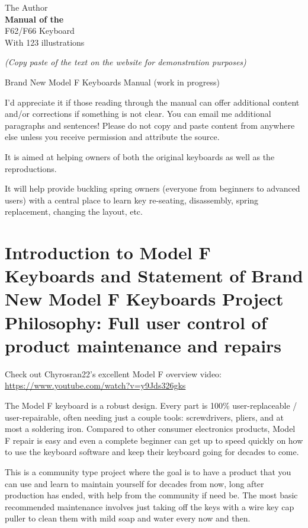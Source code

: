 \documentclass[a5paper, twoside]{memoir}
\newcommand*{\plogo}{\fbox{$\mathcal{PL}$}}
\newcommand*{\titleTH}{\begingroup %
\raggedleft
\vspace*{\baselineskip}
{\Large The Author}\\[0.167\textheight]
{\bfseries Manual of the}\\[\baselineskip]
{{\Huge F62/F66 Keyboard}}\\[\baselineskip]
{\small With 123 illustrations}\par
\vfill
\vspace*{3\baselineskip}
\endgroup}
\begin{document}
\pagestyle{empty}
\afterpage{\restorepagecolor}
\color{white}
\titleTH
\cleardoublepage
\color{black}

\frontmatter
\tableofcontents*

\mainmatter


\emph{(Copy paste of the text on the website for demonstration purposes)}

Brand New Model F Keyboards Manual (work in progress)

I’d appreciate it if those reading through the manual can offer additional content and/or corrections if something is not clear.   You can email me additional paragraphs and sentences!  Please do not copy and paste content from anywhere else unless you receive permission and attribute the source.

It is aimed at helping owners of both the original keyboards as well as the reproductions.

It will help provide buckling spring owners (everyone from beginners to advanced users) with a central place to learn key re-seating, disassembly, spring replacement, changing the layout, etc.

\section{Introduction to Model F Keyboards and Statement of Brand New Model F Keyboards Project Philosophy: Full user control of product maintenance and repairs}

    Check out Chyrosran22’s excellent Model F overview video:  \url{https://www.youtube.com/watch?v=y9Jds326gks}

    The Model F keyboard is a robust design. Every part is 100\% user-replaceable / user-repairable, often needing just a couple tools: screwdrivers, pliers, and at most a soldering iron. Compared to other consumer electronics products, Model F repair is easy and even a complete beginner can get up to speed quickly on how to use the keyboard software and keep their keyboard going for decades to come.

    This is a community type project where the goal is to have a product that you can use and learn to maintain yourself for decades from now, long after production has ended, with help from the community if need be. The most basic recommended maintenance involves just taking off the keys with a wire key cap puller to clean them with mild soap and water every now and then.
\end{document}
